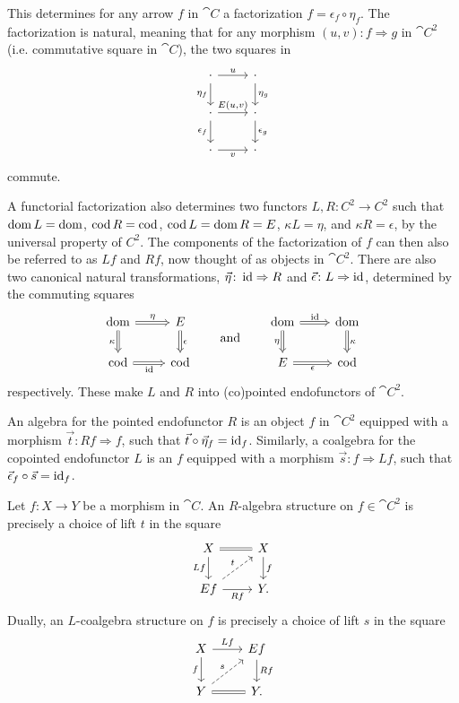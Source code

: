 This determines for any arrow $f$ in $\cat{C}$ a factorization $f=\epsilon_f\circ\eta_f$. The factorization is natural, meaning that for any morphism $(u,v)\colon f\Rightarrow g$ in $\cat{C}^2$ (i.e. commutative square in $\cat{C}$), the two squares in
\[
\begin{tikzcd}
	\cdot \rar{u} \dar[swap]{\eta_f} & \cdot \dar{\eta_g} \\
	\cdot \rar{E(u,v)} \dar[swap]{\epsilon_f} & \cdot \dar{\epsilon_g} \\
	\cdot \rar[swap]{v} & \cdot
\end{tikzcd}
\]
commute.

A functorial factorization also determines two functors $L,R\colon C^2\to C^2$ such that $\operatorname{dom} L=\operatorname{dom}$, $\operatorname{cod} R=\operatorname{cod}$, $\operatorname{cod} L = \operatorname{dom} R = E$, $\kappa L = \eta$, and $\kappa R=\epsilon$, by the universal property of $C^2$. The components of the factorization of $f$ can then also be referred to as $Lf$ and $Rf$, now thought of as objects in $\cat{C}^2$. There are also two canonical natural transformations, $\vec{\eta}\colon \operatorname{id}\Rightarrow R$ and $\vec{\epsilon}\colon L\Rightarrow\operatorname{id}$, determined by the commuting squares
\[
\begin{tikzcd}[arrows=Rightarrow]
	\dom \rar{\eta} \dar[swap]{\kappa} & E \dar{\epsilon} \\
	\cod \rar[swap]{\id} & \cod
\end{tikzcd}
\qquad\text{and}\qquad
\begin{tikzcd}[arrows=Rightarrow]
	\dom \rar{\id} \dar[swap]{\eta} & \dom \dar{\kappa} \\
	E \rar[swap]{\epsilon} & \cod
\end{tikzcd}
\]
respectively. These make $L$ and $R$ into (co)pointed endofunctors of $\cat{C}^2$.

An algebra for the pointed endofunctor $R$ is an object $f$ in $\cat{C}^2$ equipped with a morphism $\vec{t}\colon Rf\Rightarrow f$, such that $\vec{t}\circ\vec{\eta}_f=\operatorname{id}_f$. Similarly, a coalgebra for the copointed endofunctor $L$ is an $f$ equipped with a morphism $\vec{s}\colon f\Rightarrow Lf$, such that $\vec{\epsilon}_f\circ\vec{s}=\operatorname{id}_f$.

\begin{lemma}
	Let $f\colon X\to Y$ be a morphism in $\cat{C}$. An $R$-algebra structure on $f\in\cat{C}^2$ is precisely a choice of lift $t$ in the square
	\begin{equation}\label{Eq:RAlg}
	\begin{tikzcd}
		X \rar[equals] \dar[swap]{Lf} & X \dar{f} \\
		Ef \rar[swap]{Rf} \urar[dashed]{t} & Y.
	\end{tikzcd}
	\end{equation}
	Dually, an $L$-coalgebra structure on $f$ is precisely a choice of lift $s$ in the square
	\begin{equation}\label{Eq:LAlg}
	\begin{tikzcd}
		X \rar{Lf} \dar[swap]{f} & Ef \dar{Rf} \\
		Y \rar[equals] \urar[dashed]{s} & Y.
	\end{tikzcd}
	\end{equation}
\end{lemma}

